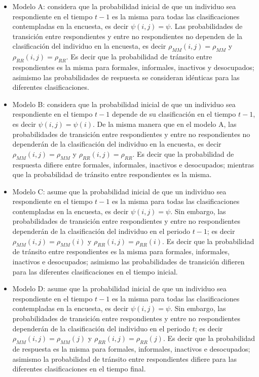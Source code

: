 \documentclass[
  12pt,
]{book}
\providecommand{\tightlist}{%
  \setlength{\itemsep}{0pt}\setlength{\parskip}{0pt}}
\begin{document}
\begin{itemize}
\tightlist
\item
  Modelo A: considera que la probabilidad inicial de que un individuo sea respondiente en el tiempo \(t-1\) es la misma para todas las clasificaciones contempladas en la encuesta, es decir \(\psi(i,j)=\psi\). Las probabilidades de transición entre respondientes y entre no respondientes no dependen de la clasificación del individuo en la encuesta, es decir \(\rho_{MM}(i,j)=\rho_{MM}\) y \(\rho_{RR}(i,j)=\rho_{RR}\). Es decir que la probabilidad de tránsito entre respondientes es la misma para formales, informales, inactivos y desocupados; asimismo las probabilidades de respuesta se consideran idénticas para las diferentes clasificaciones.
\item
  Modelo B: considera que la probabilidad inicial de que un individuo sea respondiente en el tiempo \(t-1\) depende de su clasificación en el tiempo \(t-1\), es decir \(\psi(i,j)=\psi(i)\). De la misma manera que en el modelo A, las probabilidades de transición entre respondientes y entre no respondientes no dependerán de la clasificación del individuo en la encuesta, es decir \(\rho_{MM}(i,j)=\rho_{MM}\) y \(\rho_{RR}(i,j)=\rho_{RR}\). Es decir que la probabilidad de respuesta difiere entre formales, informales, inactivos e desocupados; mientras que la probabilidad de tránsito entre respondientes es la misma.
\item
  Modelo C: asume que la probabilidad inicial de que un individuo sea respondiente en el tiempo \(t-1\) es la misma para todas las clasificaciones contempladas en la encuesta, es decir \(\psi(i,j)=\psi\). Sin embargo, las probabilidades de transición entre respondientes y entre no respondientes dependerán de la clasificación del individuo en el periodo \(t-1\); es decir \(\rho_{MM}(i,j)=\rho_{MM}(i)\) y \(\rho_{RR}(i,j)=\rho_{RR}(i)\). Es decir que la probabilidad de tránsito entre respondientes es la misma para formales, informales, inactivos e desocupados; asimismo las probabilidades de transición difieren para las diferentes clasificaciones en el tiempo inicial.
\item
  Modelo D: asume que la probabilidad inicial de que un individuo sea respondiente en el tiempo \(t-1\) es la misma para todas las clasificaciones contempladas en la encuesta, es decir \(\psi(i,j)=\psi\). Sin embargo, las probabilidades de transición entre respondientes y entre no respondientes dependerán de la clasificación del individuo en el periodo \(t\); es decir \(\rho_{MM}(i,j)=\rho_{MM}(j)\) y \(\rho_{RR}(i,j)=\rho_{RR}(j)\). Es decir que la probabilidad de respuesta es la misma para formales, informales, inactivos e desocupados; asimismo la probabilidad de tránsito entre respondientes difiere para las diferentes clasificaciones en el tiempo final.
\end{itemize}
\end{document}
